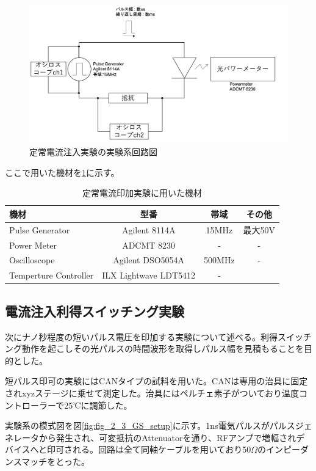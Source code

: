 \begin{figure}[htbp]
	\includegraphics[width=15cm]{figure/fig_2_2_IL_setup.png}
	\caption{定常電流注入実験の実験系回路図}
	\label{fig:fig_2_2_IL_setup}
\end{figure}
\clearpage
ここで用いた機材を\ref{table:table_2_2_IL_setup}に示す。
\begin{table}[h]
  \caption{定常電流印加実験に用いた機材}
    \label{table:table_2_2_IL_setup}
  \centering
  \begin{tabular}{lccc}
    \hline
    機材  & 型番 &帯域  & その他  \\
    \hline \hline
    Pulse Generator  & Agilent 8114A & 15MHz &最大50V \\
    Power Meter  &  ADCMT 8230 & -&-  \\
    Oscilloscope  &  Agilent DSO5054A &500MHz&- \\
    Temperture Controller & ILX Lightwave  LDT5412&-\\
       \hline
  \end{tabular}
\end{table}
\subsection{電流注入利得スイッチング実験}%
次にナノ秒程度の短いパルス電圧を印加する実験について述べる。利得スイッチング動作を起こしその光パルスの時間波形を取得しパルス幅を見積もることを目的とした。

短パルス印可の実験にはCANタイプの試料を用いた。CANは専用の治具に固定されxyzステージに乗せて測定した。治具にはペルチェ素子がついており温度コントローラーで25℃に調節した。


実験系の模式図を図\ref{fig:fig_2_3_GS_setup}に示す。1ns電気パルスがパルスジェネレータから発生され、可変抵抗のAttenuatorを通り、RFアンプで増幅されデバイスへと印可される。回路は全て同軸ケーブルを用いており50$\Omega$のインピーダンスマッチをとった。

